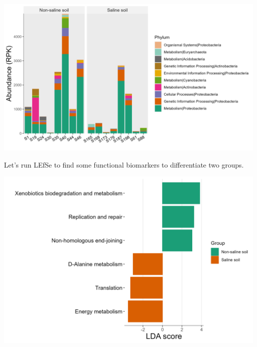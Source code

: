 \documentclass[
]{book}
\newenvironment{Shaded}{\begin{snugshade}}{\end{snugshade}}
\newcommand{\AttributeTok}[1]{\textcolor[rgb]{0.77,0.63,0.00}{#1}}
\newcommand{\CommentTok}[1]{\textcolor[rgb]{0.56,0.35,0.01}{\textit{#1}}}
\newcommand{\ConstantTok}[1]{\textcolor[rgb]{0.00,0.00,0.00}{#1}}
\newcommand{\DecValTok}[1]{\textcolor[rgb]{0.00,0.00,0.81}{#1}}
\newcommand{\FunctionTok}[1]{\textcolor[rgb]{0.00,0.00,0.00}{#1}}
\newcommand{\NormalTok}[1]{#1}
\newcommand{\OtherTok}[1]{\textcolor[rgb]{0.56,0.35,0.01}{#1}}
\newcommand{\SpecialCharTok}[1]{\textcolor[rgb]{0.00,0.00,0.00}{#1}}
\newcommand{\StringTok}[1]{\textcolor[rgb]{0.31,0.60,0.02}{#1}}
\begin{document}
\begin{center}\includegraphics[width=800px]{Images/file2meco_HUMANN_KEGG_bar_taxafunc} \end{center}

Let's run LEfSe to find some functional biomarkers to differentiate two groups.

\begin{Shaded}
\end{Shaded}

\begin{center}\includegraphics[width=700px]{Images/file2meco_HUMANN_KEGG_lefse_bar} \end{center}
\end{document}
